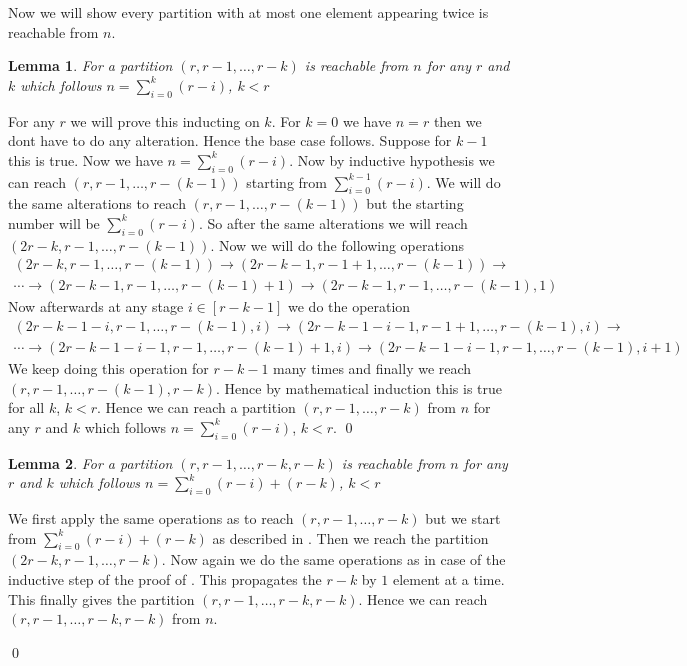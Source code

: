 \documentclass[a4paper, 11pt]{article}
\newtheorem{lemma}{Lemma}
\renewenvironment{proof}{\noindent{\it \textbf{Proof:}}\hspace*{1em}}{\hfill\qed\bigskip\\}
\begin{document}
{Now we will show every partition with at most one element appearing twice is reachable from $n$.
\begin{lemma}\label{lem14}
	For a partition $(r,r-1,\dots, r-k)$  is reachable from $n$ for any $r$ and $k$ which follows  $n=\sum\limits_{i=0}^k(r-i)$, $k<r$
\end{lemma}
\begin{proof}
	For any $r$ we will prove this inducting on $k$. For $k=0$ we have $n=r$ then we dont have to do any alteration. Hence the base case follows. Suppose for $k-1$ this is true. Now we have $n=\sum\limits_{i=0}^{k}(r-i)$. Now by inductive hypothesis we can reach $(r,r-1,\dots, r-(k-1))$ starting from $\sum\limits_{i=0}^{k-1}(r-i)$. We will do the same alterations to reach $(r,r-1,\dots, r-(k-1))$ but the starting number will be $\sum\limits_{i=0}^{k}(r-i)$. So after the same alterations we will reach $(2r-k,r-1,\dots, r-(k-1))$. Now we will do the following operations\begin{multline*}
		(2r-k,r-1,\dots, r-(k-1))\to (2r-k-1,r-1+1,\dots, r-(k-1))\to\\
		\cdots\to (2r-k-1,r-1,\dots, r-(k-1)+1) \to (2r-k-1,r-1,\dots, r-(k-1),1)
	\end{multline*}Now afterwards at any stage $i\in[r-k-1]$ we do the operation \begin{multline*}
		(2r-k-1-i,r-1,\dots, r-(k-1),i)\to (2r-k-1-i-1,r-1+1,\dots, r-(k-1),i)\to\\
		\cdots\to(2r-k-1-i-1,r-1,\dots, r-(k-1)+1,i)\to  (2r-k-1-i-1,r-1,\dots, r-(k-1),i+1)
	\end{multline*}We keep doing this operation for $r-k-1$ many times and finally we reach $(r,r-1,\dots, r-(k-1),r-k)$. Hence by mathematical induction this is true for all $k$, $k<r$. Hence we can reach  a partition $(r,r-1,\dots, r-k)$ from $n$ for any $r$ and $k$ which follows  $n=\sum\limits_{i=0}^k(r-i)$, $k<r$.
\end{proof}
\begin{lemma}\label{lem15}
	For a partition $(r,r-1,\dots, r-k,r-k)$  is reachable from $n$ for any $r$ and $k$ which follows  $n=\sum\limits_{i=0}^k(r-i)+(r-k)$, $k<r$
\end{lemma}
\begin{proof}
	We first apply the same operations as to reach $(r,r-1,\dots, r-k)$ but we start from $\sum\limits_{i=0}^k(r-i)+(r-k)$ as described in . Then we reach the partition $(2r-k,r-1,\dots, r-k)$. Now again we do the same operations as in case of the inductive step of the proof of . This propagates the $r-k$ by $1$ element at a time. This finally gives the partition $(r,r-1,\dots, r-k,r-k)$. Hence we can reach $(r,r-1,\dots, r-k,r-k)$ from $n$. 

\end{proof}}
\end{document}

